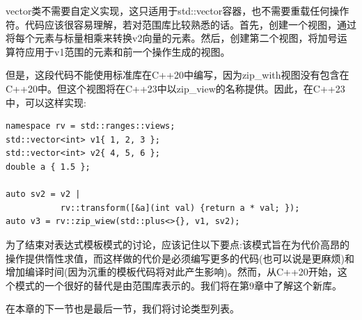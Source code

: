 vector类不需要自定义实现，这只适用于std::vector容器，也不需要重载任何操作符。代码应该很容易理解，若对范围库比较熟悉的话。首先，创建一个视图，通过将每个元素与标量相乘来转换v2向量的元素。然后，创建第二个视图，将加号运算符应用于v1范围的元素和前一个操作生成的视图。

但是，这段代码不能使用标准库在C++20中编写，因为zip\_with视图没有包含在C++20中。但这个视图将在C++23中以zip\_view的名称提供。因此，在C++23中，可以这样实现:

\begin{lstlisting}[style=styleCXX]
namespace rv = std::ranges::views;
std::vector<int> v1{ 1, 2, 3 };
std::vector<int> v2{ 4, 5, 6 };
double a { 1.5 };

auto sv2 = v2 |
           rv::transform([&a](int val) {return a * val; });
auto v3 = rv::zip_wiew(std::plus<>{}, v1, sv2);
\end{lstlisting}

为了结束对表达式模板模式的讨论，应该记住以下要点:该模式旨在为代价高昂的操作提供惰性求值，而这样做的代价是必须编写更多的代码(也可以说是更麻烦)和增加编译时间(因为沉重的模板代码将对此产生影响)。然而，从C++20开始，这个模式的一个很好的替代是由范围库表示的。我们将在第9章中了解这个新库。

在本章的下一节也是最后一节，我们将讨论类型列表。













